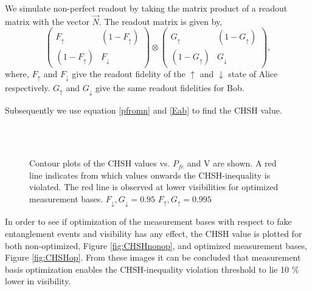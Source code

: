 We simulate non-perfect readout by taking the matrix product of a readout matrix with the vector $\vec{N}$. The readout matrix is given by, 
\begin{equation}
\left( \begin{matrix}
F_{\uparrow} & (1-F_{\uparrow}) \\
(1-F_{\uparrow}) & F_{\downarrow}
\end{matrix} \right) \otimes
\left( \begin{matrix}
G_{\uparrow} & (1-G_{\uparrow}) \\
(1-G_{\uparrow}) & G_{\downarrow}
\end{matrix} \right),
\end{equation}
where, $F_\uparrow$ and $F_\downarrow$ give the readout fidelity of the $\uparrow$ and $\downarrow$ state of Alice respectively. $G_\uparrow$ and $G_\downarrow$ give the same readout fidelities for Bob. 

Subsequently we use equation \ref{pfromn} and \ref{Eab} to find the CHSH value.

\begin{figure}[h!]\centering
{}\\ %
         ~ %
         ~ %
          \caption{Contour plots of the CHSH values vs. $P_{fe}$ and V are shown. A red line indicates from which values onwards the CHSH-inequality is violated. The red line is observed at lower visibilities for optimized measurement bases. $F_\downarrow, G_\downarrow = 0.95$ $F_\uparrow, G_\uparrow = 0.995$ }\label{fig:CHSHopnonop}

\end{figure}

In order to see if optimization of the measurement bases with respect to fake entanglement events and visibility has any effect, the CHSH value is plotted for both non-optimized, Figure \ref{fig:CHSHnonop}, and optimized measurement bases, Figure \ref{fig:CHSHop}. From these images it can be concluded that measurement basis optimization enables the CHSH-inequality violation threshold to lie 10 \% lower in visibility.

